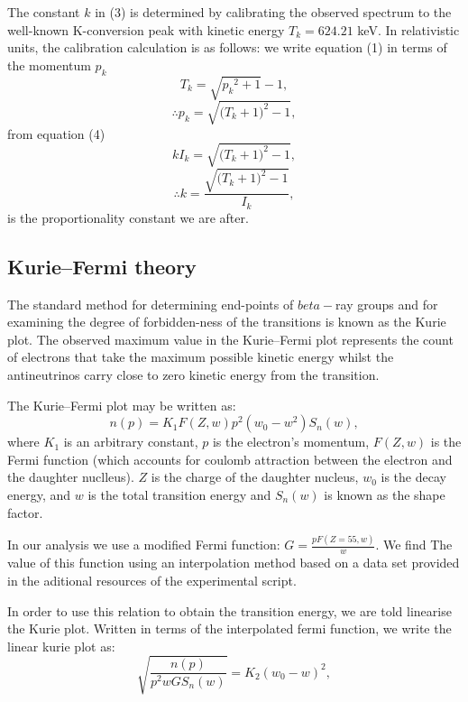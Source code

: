 \documentclass[9pt, a4paper]{article}
\begin{document}
\begin{multicols}{2}
The constant $k$ in (3) is determined by calibrating the observed spectrum to the well-known K-conversion peak with kinetic energy $T_k = 624.21$ keV.
In relativistic units, the calibration calculation is as follows:
we write equation (1) in terms of the momentum $p_k$
\begin{equation}T_k = \sqrt{{p_{k}}^{2} + 1} -1,
\end{equation}
\begin{equation} \therefore p_k = \sqrt{({T_{k} + 1)}^{2} - 1 },
\end{equation}
from equation (4)
\begin{equation} k I_k = \sqrt{({T_{k} + 1)}^{2} - 1 },
\end{equation}
\begin{equation} \therefore k = \frac{\sqrt{({T_{k} + 1)}^{2} - 1 }}{I_k},
\end{equation}is the proportionality constant we are after.

\subsection{Kurie--Fermi theory}

The standard method for determining end-points of $beta-$ray groups and for examining the degree of forbidden-ness of the transitions\cite{SPA} is known as the Kurie plot. The observed maximum value in the Kurie--Fermi plot represents the count of electrons that take the maximum possible kinetic energy whilst the antineutrinos carry close to zero kinetic energy from the transition.

The Kurie--Fermi plot may be written as: 
\begin{equation} n(p) = K_1 F(Z, w) p^2(w_0 - w^2) S_n(w),
\end{equation}
where $K_1$ is an arbitrary constant, $p$ is the electron's momentum, $F(Z, w)$ is the Fermi function (which accounts for coulomb attraction between the electron and the daughter nuclleus). $Z$ is the charge of the daughter nucleus, $w_0$ is the decay energy, and $w$ is the total transition energy and $S_n(w)$ is known as the shape factor. 

In our analysis we use a modified Fermi function: 
$G = \frac{p F(Z=55, w)}{w}$. We find The value of this function using an interpolation method based on a data set provided in the aditional resources of the experimental script.

In order to use this relation to obtain the transition energy, we are told linearise the Kurie plot. 
Written in terms of the interpolated fermi function, we write the linear kurie plot as:
\begin{equation} \sqrt{\frac{n(p)}{p^2 w G S_n(w)}}= K_2 (w_0 - w)^2,
\end{equation}


\end{multicols}
\end{document}
